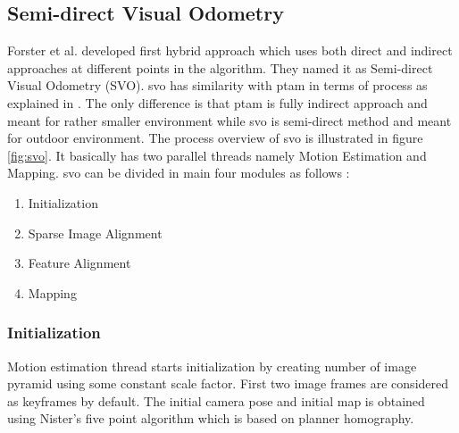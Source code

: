 \subsection{Semi-direct Visual Odometry}
Forster et al.\cite{Forster2014ICRA} developed first hybrid approach which uses both direct and indirect approaches at different points in the algorithm. They named it as Semi-direct Visual Odometry (SVO). \acrshort{svo} has similarity with \acrshort{ptam} in terms of process as explained in \cite{4538852}. The only difference is that \acrshort{ptam} is fully indirect approach and meant for rather smaller environment while \acrshort{svo} is semi-direct method and meant for outdoor environment. The process overview of \acrshort{svo} is illustrated in figure \ref{fig:svo}. It basically has two parallel threads namely Motion Estimation and Mapping. \acrshort{svo} can be divided in main four modules as follows :
\begin{enumerate}
	\item Initialization
	\item Sparse Image Alignment
	\item Feature Alignment
	\item Mapping
\end{enumerate}
\subsubsection{Initialization}
Motion estimation thread starts initialization by creating number of image pyramid using some constant scale factor. First two image frames are considered as keyframes by default. The initial camera pose and initial map is obtained using Nister's five point algorithm \cite{Nister} which is based on planner homography.


